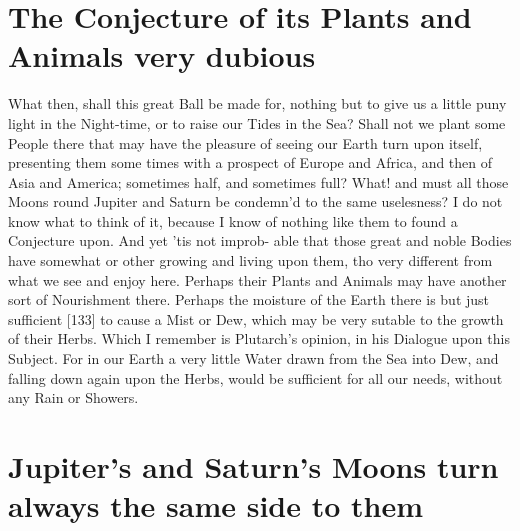 \documentclass[letterpaper]{book}
\begin{document}
\section{The Conjecture of its Plants and Animals very dubious}

What then, shall this great Ball be made for, nothing but to give us a little
puny light in the Night-time, or to raise our Tides in the Sea? Shall not
we plant some People there that may have the pleasure of seeing our Earth
turn upon itself, presenting them some times with a prospect of Europe and
Africa, and then of Asia and America; sometimes half, and sometimes full?
What! and must all those Moons round Jupiter and Saturn be condemn'd
to the same uselesness? I do not know what to think of it, because I know
of nothing like them to found a Conjecture upon. And yet 'tis not improb-
able that those great and noble Bodies have somewhat or other growing
and living upon them, tho very different from what we see and enjoy here.
Perhaps their Plants and Animals may have another sort of Nourishment
there. Perhaps the moisture of the Earth there is but just sufficient [133]
to cause a Mist or Dew, which may be very sutable to the growth of their
Herbs. Which I remember is Plutarch's opinion, in his Dialogue upon this
Subject. For in our Earth a very little Water drawn from the Sea into Dew,
and falling down again upon the Herbs, would be sufficient for all our needs,
without any Rain or Showers.


\section{Jupiter's and Saturn's Moons turn always the same side to them}
\end{document}
